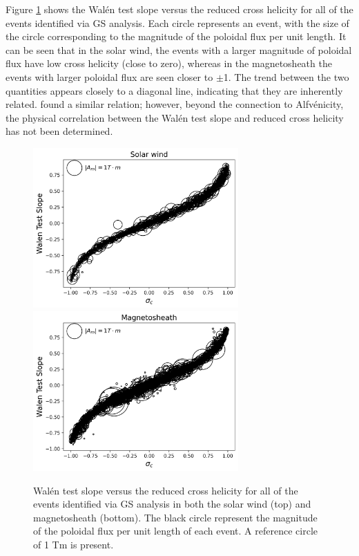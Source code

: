 Figure \ref{fig:walen-crosshelicity} shows the Wal\'en test slope versus the reduced cross helicity for all of the events identified via GS analysis. Each circle represents an event, with the size of the circle corresponding to the magnitude of the poloidal flux per unit length. It can be seen that in the solar wind, the events with a larger magnitude of poloidal flux have low cross helicity (close to zero), whereas in the magnetosheath the events with larger poloidal flux are seen closer to $\pm$1. The trend between the two quantities appears closely to a diagonal line, indicating that they are inherently related. \cite{Chen:2022} found a similar relation; however, beyond the connection to Alfv\'enicity, the physical correlation between the Wal\'en test slope and reduced cross helicity has not been determined.

\begin{figure}
    \centering
    \includegraphics[width=0.7\textwidth]{Figures/GS analysis/walenTest_vs_crosshelicity_solarwind.png}
    \includegraphics[width=0.7\textwidth]{Figures/GS analysis/walenTest_vs_crosshelicity_magnetosheath.png}
    \caption[Wal\'en test slope vs. reduced cross helicity]{Wal\'en test slope versus the reduced cross helicity for all of the events identified via GS analysis in both the solar wind (top) and magnetosheath (bottom). The black circle represent the magnitude of the poloidal flux per unit length of each event. A reference circle of 1 Tm is present.}
    \label{fig:walen-crosshelicity}
\end{figure}

